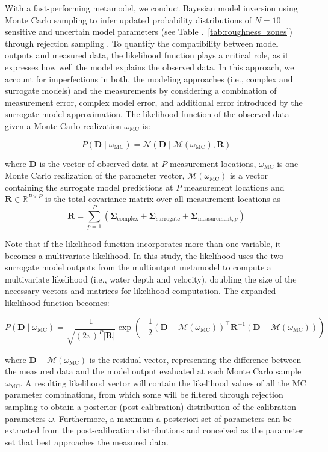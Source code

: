 \documentclass[draft,linenumbers,onecolumn]{agujournal2019} %
\begin{document}
With a fast-performing metamodel, we conduct Bayesian model inversion using Monte Carlo sampling to infer updated probability distributions of \(N = 10\) sensitive and uncertain model parameters (see Table .~\ref{tab:roughness_zones}) through rejection sampling \cite{beckers2020bayesian}. To quantify the compatibility between model outputs and measured data, the likelihood function plays a critical role, as it expresses how well the model explains the observed data. In this approach, we account for imperfections in both, the modeling approaches (i.e., complex and surrogate models) and the measurements by considering a combination of measurement error, complex model error, and additional error introduced by the surrogate model approximation. The likelihood function of the observed data given a Monte Carlo realization \( \omega_{\text{MC}} \) is:

\[
P(\bm{D} \mid \omega_{\text{MC}}) = \mathcal{N}(\bm{D} \mid \mathcal{M}(\omega_{\text{MC}}), \bm{R})
\]

where \( \bm{D} \) is the vector of observed data at \(P\) measurement locations, \( \omega_{\text{MC}} \) is one Monte Carlo realization of the parameter vector, \( \mathcal{M}(\omega_{\text{MC}}) \) is a vector containing the surrogate model predictions at \(P\) measurement locations and \( \bm{R} \in \mathbb{R}^{P \times P} \) is the total covariance matrix over all measurement locations as 
\[
\mathbf{R} = \sum_{p=1}^{P} \left( \mathbf{\Sigma}_{\text{complex}} + \mathbf{\Sigma}_{\text{surrogate}} + \mathbf{\Sigma}_{\text{measurement},p} \right)
\]

Note that if the likelihood function incorporates more than one variable, it becomes a multivariate likelihood. In this study, the likelihood uses the two surrogate model outputs from the multioutput metamodel to compute a multivariate likelihood (i.e., water depth and velocity), doubling the size of the necessary vectors and matrices for likelihood computation. The expanded likelihood function becomes: 

\[
P(\bm{D} \mid \omega_{\text{MC}}) = \frac{1}{\sqrt{(2\pi)^P |\bm{R}|}} \exp\left( -\frac{1}{2} \left( \bm{D} - \mathcal{M}(\omega_{\text{MC}}) \right)^\top \bm{R}^{-1} \left( \bm{D} - \mathcal{M}(\omega_{\text{MC}}) \right) \right)
\]


where \( \bm{D} - \mathcal{M}(\omega_{\text{MC}}) \) is the residual vector, representing the difference between the measured data and the model output evaluated at each Monte Carlo sample \( \omega_{\text{MC}} \). A resulting likelihood vector will contain the likelihood values of all the MC parameter combinations, from which some will be filtered through rejection sampling \cite{smith1992bayesian} to obtain a posterior (post-calibration) distribution of the calibration parameters \(\omega\). Furthermore, a maximum a posteriori set of parameters can be extracted from the post-calibration distributions and conceived as the parameter set that best approaches the measured data.
\end{document}
